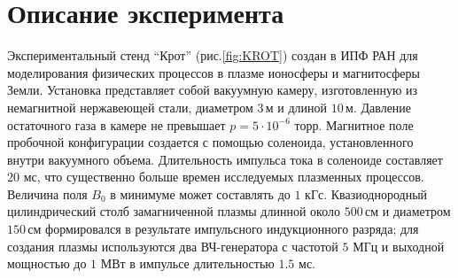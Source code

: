 \documentclass[autoref,10pt]{disser}
\begin{document}
\section{Описание эксперимента}
Экспериментальный стенд ``Крот'' (\mbox{рис.\ref{fig:KROT}}) создан в ИПФ РАН для моделирования физических процессов в плазме ионосферы и магнитосферы Земли. Установка представляет собой вакуумную камеру, изготовленную из немагнитной нержавеющей стали, диаметром $3$\,м и длиной $10$\,м.  Давление остаточного газа в камере не превышает  $p = 5\cdot10^{-6}$ торр. 
Магнитное поле пробочной конфигурации создается с помощью соленоида, установленного внутри вакуумного объема. Длительность импульса тока в соленоиде составляет $20$ мс, что существенно больше времен исследуемых плазменных процессов. Величина поля $B_{0}$ в минимуме может составлять до $1$ кГс.
Квазиоднородный цилиндрический столб замагниченной плазмы длинной около $500$\,см и диаметром $150$\,см формировался в результате импульсного индукционного разряда; для создания плазмы используются два ВЧ-генератора с частотой $5$ МГц и выходной мощностью до $1$ МВт в импульсе длительностью $1.5$ мс.
\end{document}
